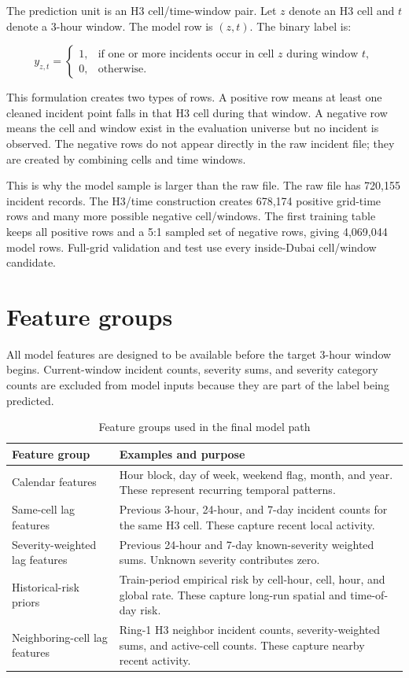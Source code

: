 The prediction unit is an H3 cell/time-window pair. Let \(z\) denote an H3 cell and \(t\) denote a 3-hour window. The model row is \((z,t)\). The binary label is:

\[
y_{z,t} =
\begin{cases}
1, & \text{if one or more incidents occur in cell } z \text{ during window } t,\\
0, & \text{otherwise.}
\end{cases}
\]

This formulation creates two types of rows. A positive row means at least one cleaned incident point falls in that H3 cell during that window. A negative row means the cell and window exist in the evaluation universe but no incident is observed. The negative rows do not appear directly in the raw incident file; they are created by combining cells and time windows.

This is why the model sample is larger than the raw file. The raw file has 720,155 incident records. The H3/time construction creates 678,174 positive grid-time rows and many more possible negative cell/windows. The first training table keeps all positive rows and a 5:1 sampled set of negative rows, giving 4,069,044 model rows. Full-grid validation and test use every inside-Dubai cell/window candidate.

\section{Feature groups}

All model features are designed to be available before the target 3-hour window begins. Current-window incident counts, severity sums, and severity category counts are excluded from model inputs because they are part of the label being predicted.

\begin{table}[H]
\centering
\caption{Feature groups used in the final model path}
\label{tab:feature_groups}
\small
\begin{tabularx}{\textwidth}{L{0.27\textwidth}Y}
\toprule
\textbf{Feature group} & \textbf{Examples and purpose} \\
\midrule
Calendar features & Hour block, day of week, weekend flag, month, and year. These represent recurring temporal patterns. \\
Same-cell lag features & Previous 3-hour, 24-hour, and 7-day incident counts for the same H3 cell. These capture recent local activity. \\
Severity-weighted lag features & Previous 24-hour and 7-day known-severity weighted sums. Unknown severity contributes zero. \\
Historical-risk priors & Train-period empirical risk by cell-hour, cell, hour, and global rate. These capture long-run spatial and time-of-day risk. \\
Neighboring-cell lag features & Ring-1 H3 neighbor incident counts, severity-weighted sums, and active-cell counts. These capture nearby recent activity. \\
\bottomrule
\end{tabularx}
\end{table}

